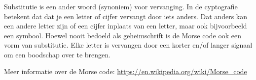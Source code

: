 Substitutie is een ander woord (synoniem) voor vervanging. In de cyptografie betekent dat dat je een letter of cijfer vervangt door iets anders. Dat anders kan een andere letter zijn of een cijfer inplaats van een letter, maar ook bijvoorbeeld een symbool. Hoewel nooit bedoeld als geheimschrift is de Morse code ook een vorm van substitutie. Elke letter is vervangen door een korter en/of langer signaal om een boodschap over te brengen.

Meer informatie over de Morse code: \url{https://en.wikipedia.org/wiki/Morse_code}
